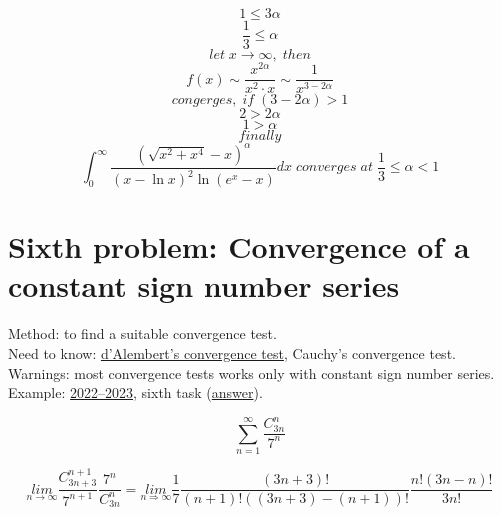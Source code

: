 \documentclass{article}
\begin{document}
\begin{equation*}
    1 \leq 3 \alpha
\end{equation*}
\begin{equation}
    \frac{1}{3} \leq \alpha
\end{equation}
\begin{equation*}
    let \; x \rightarrow \infty, \; then
\end{equation*}
\begin{equation*}
    f(x) \sim \frac{x^{2 \alpha}}{x^2 \cdot x} \sim \frac{1}{x^{3-2\alpha}}
\end{equation*}
\begin{equation*}
    congerges, \; if \; (3-2\alpha)>1
\end{equation*}
\begin{equation*}
    2 > 2 \alpha
\end{equation*}
\begin{equation}
    1 > \alpha
\end{equation}
\begin{equation*}
    finally
\end{equation*}
\begin{equation}
    \int_{0}^{\infty} \frac{(\sqrt{x^2+x^4}-x)^\alpha }{(x- \ln x)^2 \ln (e^x-x)} dx \; converges \; at \; \frac{1}{3} \leq \alpha < 1
\end{equation}


\newpage
\section{Sixth problem: Convergence of a constant sign number series}
Method: to find a suitable convergence test.\\
Need to know: \hyperlink{6.1}{d'Alembert's convergence test}, Cauchy's convergence test.\\
Warnings: most convergence tests works only with constant sign number series.\\
Example: \href{https://old.mipt.ru/education/chair/mathematics/exams/exams/2022-23/%D0%9C%D0%90%D0%98%D0%B8%D0%A0_%D0%92_23.pdf}{2022–2023}, sixth task (\href{https://old.mipt.ru/education/chair/mathematics/exams/exams/2022-23/%D0%9C%D0%90%D0%98%D0%B8%D0%A0_%D0%92_23%D0%BE%D1%82%D0%B2%D0%B5%D1%82%D1%8B.pdf}{answer}).

\begin{equation}
    \sum_{n=1}^{\infty} \frac{C_{3n}^n}{7^n}
\end{equation}

\begin{equation*}
    \underset{n \rightarrow \infty}{lim} \frac{C_{3n+3}^{n+1}}{7^{n+1}} \frac{7^n}{C_{3n}^{n}} = \underset{n \Rightarrow \infty}{lim} \frac{1}{7} \frac{(3n+3)!}{(n+1)!((3n+3)-(n+1))!} \frac{n!(3n-n)!}{3n!}
\end{equation*}
\end{document}
